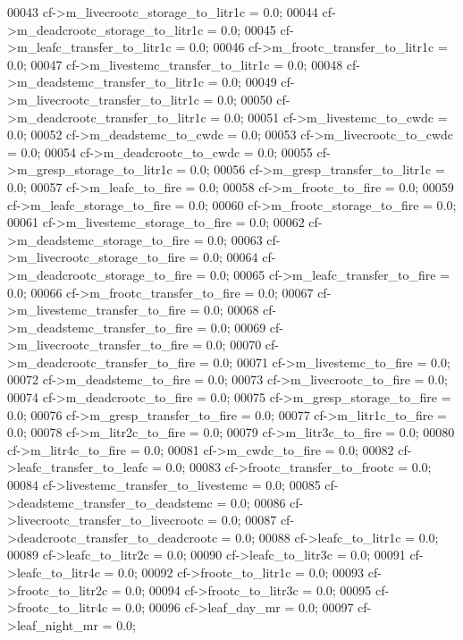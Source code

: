 \begin{DoxyCode}
00043     cf->m\_livecrootc\_storage\_to\_litr1c = 0.0;
00044     cf->m\_deadcrootc\_storage\_to\_litr1c = 0.0;
00045     cf->m\_leafc\_transfer\_to\_litr1c = 0.0;
00046     cf->m\_frootc\_transfer\_to\_litr1c = 0.0;
00047     cf->m\_livestemc\_transfer\_to\_litr1c = 0.0;
00048     cf->m\_deadstemc\_transfer\_to\_litr1c = 0.0;
00049     cf->m\_livecrootc\_transfer\_to\_litr1c = 0.0;
00050     cf->m\_deadcrootc\_transfer\_to\_litr1c = 0.0;
00051     cf->m\_livestemc\_to\_cwdc = 0.0;
00052     cf->m\_deadstemc\_to\_cwdc = 0.0;
00053     cf->m\_livecrootc\_to\_cwdc = 0.0;
00054     cf->m\_deadcrootc\_to\_cwdc = 0.0;
00055     cf->m\_gresp\_storage\_to\_litr1c = 0.0;
00056     cf->m\_gresp\_transfer\_to\_litr1c = 0.0;
00057     cf->m\_leafc\_to\_fire = 0.0;
00058     cf->m\_frootc\_to\_fire = 0.0;
00059     cf->m\_leafc\_storage\_to\_fire = 0.0;
00060     cf->m\_frootc\_storage\_to\_fire = 0.0;
00061     cf->m\_livestemc\_storage\_to\_fire = 0.0;
00062     cf->m\_deadstemc\_storage\_to\_fire = 0.0;
00063     cf->m\_livecrootc\_storage\_to\_fire = 0.0;
00064     cf->m\_deadcrootc\_storage\_to\_fire = 0.0;
00065     cf->m\_leafc\_transfer\_to\_fire = 0.0;
00066     cf->m\_frootc\_transfer\_to\_fire = 0.0;
00067     cf->m\_livestemc\_transfer\_to\_fire = 0.0;
00068     cf->m\_deadstemc\_transfer\_to\_fire = 0.0;
00069     cf->m\_livecrootc\_transfer\_to\_fire = 0.0;
00070     cf->m\_deadcrootc\_transfer\_to\_fire = 0.0;
00071     cf->m\_livestemc\_to\_fire = 0.0;
00072     cf->m\_deadstemc\_to\_fire = 0.0;
00073     cf->m\_livecrootc\_to\_fire = 0.0;
00074     cf->m\_deadcrootc\_to\_fire = 0.0;
00075     cf->m\_gresp\_storage\_to\_fire = 0.0;
00076     cf->m\_gresp\_transfer\_to\_fire = 0.0;
00077     cf->m\_litr1c\_to\_fire = 0.0;
00078     cf->m\_litr2c\_to\_fire = 0.0;
00079     cf->m\_litr3c\_to\_fire = 0.0;
00080     cf->m\_litr4c\_to\_fire = 0.0;
00081     cf->m\_cwdc\_to\_fire = 0.0;
00082     cf->leafc\_transfer\_to\_leafc = 0.0;
00083     cf->frootc\_transfer\_to\_frootc = 0.0;
00084     cf->livestemc\_transfer\_to\_livestemc = 0.0;
00085     cf->deadstemc\_transfer\_to\_deadstemc = 0.0;
00086     cf->livecrootc\_transfer\_to\_livecrootc = 0.0;
00087     cf->deadcrootc\_transfer\_to\_deadcrootc = 0.0;
00088     cf->leafc\_to\_litr1c = 0.0;
00089     cf->leafc\_to\_litr2c = 0.0;
00090     cf->leafc\_to\_litr3c = 0.0;
00091     cf->leafc\_to\_litr4c = 0.0;
00092     cf->frootc\_to\_litr1c = 0.0;
00093     cf->frootc\_to\_litr2c = 0.0;
00094     cf->frootc\_to\_litr3c = 0.0;
00095     cf->frootc\_to\_litr4c = 0.0;
00096     cf->leaf\_day\_mr = 0.0;
00097     cf->leaf\_night\_mr = 0.0;

\end{DoxyCode}
